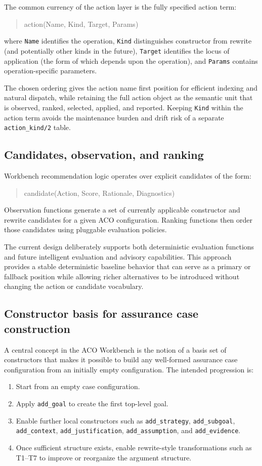 \documentclass[12pt,twoside,a4paper]{article}
\begin{document}
The common currency of the action layer is the fully specified action term:
\begin{quote}\ttfamily
action(Name, Kind, Target, Params)
\end{quote}
where \texttt{Name} identifies the operation, \texttt{Kind} distinguishes constructor from rewrite (and potentially other kinds in the future), \texttt{Target} identifies the locus of application (the form of which depends upon the operation), and \texttt{Params} contains operation-specific parameters.

The chosen ordering gives the action name first position for efficient indexing and natural dispatch, while retaining the full action object as the semantic unit that is observed, ranked, selected, applied, and reported.
Keeping \texttt{Kind} within the action term avoids the maintenance burden and drift risk of a separate \texttt{action\_kind/2} table.

\subsection{Candidates, observation, and ranking}

Workbench recommendation logic operates over explicit candidates of the form:
\begin{quote}\ttfamily
candidate(Action, Score, Rationale, Diagnostics)
\end{quote}
Observation functions generate a set of currently applicable constructor and rewrite candidates for a given ACO configuration.
Ranking functions then order those candidates using pluggable evaluation policies.

The current design deliberately supports both deterministic evaluation functions and future intelligent evaluation and advisory capabilities.
This approach provides a stable deterministic baseline behavior that can serve as a primary or fallback position while allowing richer alternatives to be introduced without changing the action or candidate vocabulary.

\subsection{Constructor basis for assurance case construction}

A central concept in the ACO Workbench is the notion of a basis set of constructors that makes it possible to build any well-formed assurance case configuration from an initially empty configuration.
The intended progression is:
\begin{enumerate}
  \item Start from an empty case configuration.
  \item Apply \texttt{add\_goal} to create the first top-level goal.
  \item Enable further local constructors such as \texttt{add\_strategy}, \texttt{add\_subgoal}, \texttt{add\_context}, \texttt{add\_justification}, \texttt{add\_assumption}, and \texttt{add\_evidence}.
  \item Once sufficient structure exists, enable rewrite-style transformations such as T1--T7 to improve or reorganize the argument structure.
\end{enumerate}
\end{document}
